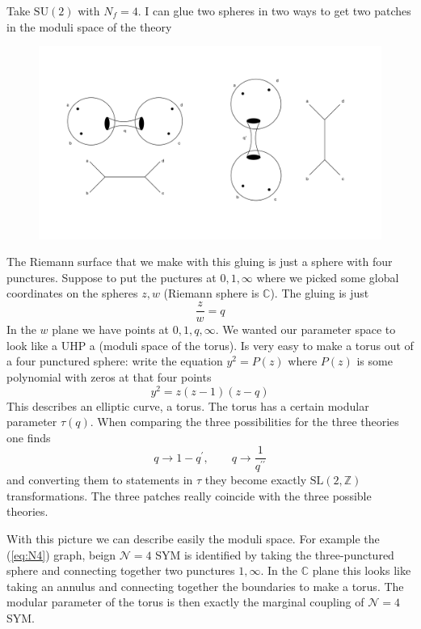 \documentclass[11pt]{article}
\theoremstyle{definition}
\numberwithin{equation}{section}
\newcommand*\cN{\mathcal{N}}
\newcommand*\bbC{\mathbb{C}}
\newcommand*\bbZ{\mathbb{Z}}
\newcommand*\SU{\mathrm{SU}}
\newcommand*\SL{\mathrm{SL}}
\begin{document}
Take $\SU(2)$ with $N_{f}=4$. I can glue two spheres in two ways to get two patches in the moduli space of the theory
\begin{figure}[H]
\includegraphics[width=\textwidth]{su2.pdf}
\end{figure}
The Riemann surface that we make with this gluing is just a sphere with four punctures. Suppose to put the puctures at $0,1,\infty$ where we picked some global coordinates on the spheres $z,w$ (Riemann sphere is $\bbC$). The gluing is just 
\begin{equation}
	\frac{z}{w}=q
\end{equation}
In the $w$ plane we have points at $0,1,q,\infty$. We wanted our parameter space to look like a UHP a (moduli space of the torus). Is very easy to make a torus out of a four punctured sphere: write the equation $y^{2}=P(z)$ where $P(z)$ is some polynomial with zeros at that four points
\begin{equation}
	y^{2}=z(z-1)(z-q)
\end{equation}
This describes an elliptic curve, a torus. The torus has a certain modular parameter $\tau(q)$. When comparing the three possibilities for the three theories one finds
\begin{equation}
	q\rightarrow1-q^{\prime},\qquad q\rightarrow\frac{1}{q^{\prime\prime}}
\end{equation}
and converting them to statements in $\tau$ they become exactly $\SL(2,\bbZ)$ transformations. The three patches really coincide with the three possible theories.

With this picture we can describe easily the moduli space. For example the (\ref{eq:N4}) graph, beign $\cN=4$ SYM is identified by taking the three-punctured sphere and connecting together two punctures $1,\infty$. In the $\bbC$ plane this looks like taking an annulus and connecting together the boundaries to make a torus. The modular parameter of the torus is then exactly the marginal coupling of $\cN=4$ SYM.
\end{document}
